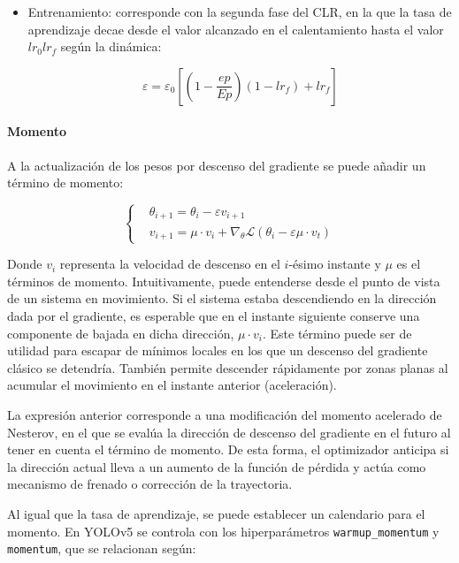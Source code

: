 \documentclass{article}
\begin{document}
\begin{itemize}
		\item Entrenamiento: corresponde con la segunda fase del CLR, en la que la tasa de aprendizaje decae desde el valor alcanzado en el calentamiento hasta el valor $lr_0 lr_f$ según la dinámica:
		
		\begin{equation}
			\varepsilon = \varepsilon_0 \left[\left(1 - \frac{ep}{Ep}\right)(1 - lr_f) + lr_f\right]
		\end{equation}	
	\end{itemize}
	
	\paragraph{Momento} $$ $$
	A la actualización de los pesos por descenso del gradiente se puede añadir un término de momento:
	
	\begin{equation}
	\begin{cases}
		& \theta_{i+1} = \theta_i - \varepsilon v_{i+1} \\
		& v_{i+1} = \mu \cdot v_i + \nabla_{\theta}\mathcal{L}(\theta_i - \varepsilon \mu \cdot v_t)
	\end{cases}
	\end{equation}
	
	Donde $v_i$ representa la velocidad de descenso en el $i$-ésimo instante y $\mu$ es el términos de momento. Intuitivamente, puede entenderse desde el punto de vista de un sistema en movimiento. Si el sistema estaba descendiendo en la dirección dada por el gradiente, es esperable que en el instante siguiente conserve una componente de bajada en dicha dirección, $\mu \cdot v_i$. Este término puede ser de utilidad para escapar de mínimos locales en los que un descenso del gradiente clásico se detendría. También permite descender rápidamente por zonas planas al acumular el movimiento en el instante anterior (aceleración).
	
	La expresión anterior corresponde a una modificación del momento acelerado de Nesterov\cite{sutskever2013importance}, en el que se evalúa la dirección de descenso del gradiente en el futuro al tener en cuenta el término de momento. De esta forma, el optimizador anticipa si la dirección actual lleva a un aumento de la función de pérdida y actúa como mecanismo de frenado o corrección de la trayectoria.
	
	Al igual que la tasa de aprendizaje, se puede establecer un calendario para el momento. En YOLOv5 se controla con los hiperparámetros \texttt{warmup\_momentum} y \texttt{momentum}, que se relacionan según:
	
\end{document}
